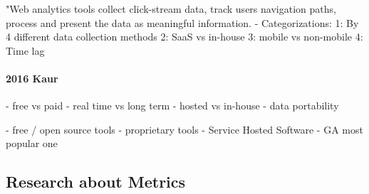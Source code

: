 "Web analytics tools collect click-stream data, track users navigation paths, process and present the data as meaningful information.
- Categorizations:
1: By 4 different data collection methods
2: SaaS vs in-house
3: mobile vs non-mobile
4: Time lag












\paragraph{2016 Kaur}







- free vs paid
- real time vs long term
- hosted vs in-house
- data portability









- free / open source tools
- proprietary tools
- Service Hosted Software
- GA most popular one












\subsection{Research about Metrics}







